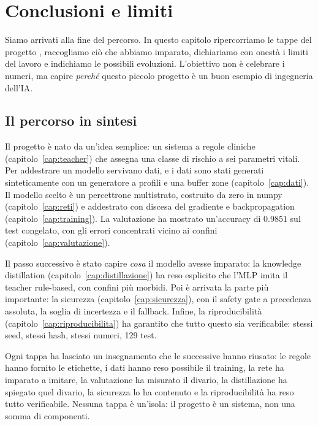 
\chapter{Conclusioni e limiti}\label{cap:conclusioni}

Siamo arrivati alla fine del percorso. In questo capitolo ripercorriamo le
tappe del progetto \progetto{}, raccogliamo ciò che abbiamo imparato,
dichiariamo con onestà i limiti del lavoro e indichiamo le possibili
evoluzioni. L'obiettivo non è celebrare i numeri, ma capire \emph{perché}
questo piccolo progetto è un buon esempio di ingegneria dell'IA.

\section{Il percorso in sintesi}\label{sec:percorso-sintesi}

Il progetto è nato da un'idea semplice: un sistema a regole cliniche
(capitolo~\ref{cap:teacher}) che assegna una classe di rischio a sei
parametri vitali. Per addestrare un modello servivano dati, e i dati sono
stati generati sinteticamente con un generatore a profili e una buffer
zone (capitolo~\ref{cap:dati}). Il modello scelto è un percettrone
multistrato, costruito da zero in numpy (capitolo~\ref{cap:reti}) e
addestrato con discesa del gradiente e backpropagation
(capitolo~\ref{cap:training}). La valutazione ha mostrato un'accuracy di
$0.9851$ sul test congelato, con gli errori concentrati vicino ai confini
(capitolo~\ref{cap:valutazione}).

Il passo successivo è stato capire \emph{cosa} il modello avesse imparato:
la knowledge distillation (capitolo~\ref{cap:distillazione}) ha reso
esplicito che l'MLP imita il teacher rule-based, con confini più morbidi.
Poi è arrivata la parte più importante: la sicurezza
(capitolo~\ref{cap:sicurezza}), con il safety gate a precedenza assoluta,
la soglia di incertezza e il fallback. Infine, la riproducibilità
(capitolo~\ref{cap:riproducibilita}) ha garantito che tutto questo sia
verificabile: stessi seed, stessi hash, stessi numeri, 129 test.

Ogni tappa ha lasciato un insegnamento che le successive hanno riusato: le
regole hanno fornito le etichette, i dati hanno reso possibile il training,
la rete ha imparato a imitare, la valutazione ha misurato il divario, la
distillazione ha spiegato quel divario, la sicurezza lo ha contenuto e la
riproducibilità ha reso tutto verificabile. Nessuna tappa è un'isola: il
progetto è un sistema, non una somma di componenti.

